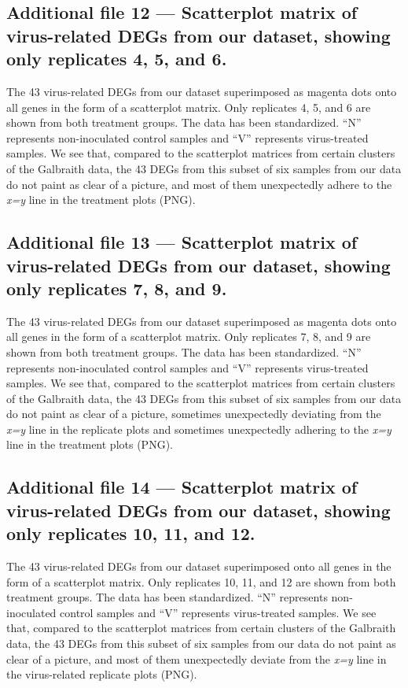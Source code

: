 \documentclass{bmcart}
\begin{document}
\begin{linenumbers}
\begin{backmatter}
  \subsection*{Additional file 12 --- Scatterplot matrix of virus-related DEGs from our dataset, showing only replicates 4, 5, and 6.}     
    The 43 virus-related DEGs from our dataset superimposed as magenta dots onto all genes in the form of a scatterplot matrix. Only replicates 4, 5, and 6 are shown from both treatment groups. The data has been standardized. ``N'' represents non-inoculated control samples and ``V'' represents virus-treated samples. We see that, compared to the scatterplot matrices from certain clusters of the Galbraith data, the 43 DEGs from this subset of six samples from our data do not paint as clear of a picture, and most of them unexpectedly adhere to the \textit{x=y} line in the treatment plots (PNG).
    
  \subsection*{Additional file 13 --- Scatterplot matrix of virus-related DEGs from our dataset, showing only replicates 7, 8, and 9.}    
    The 43 virus-related DEGs from our dataset superimposed as magenta dots onto all genes in the form of a scatterplot matrix. Only replicates 7, 8, and 9 are shown from both treatment groups. The data has been standardized. ``N'' represents non-inoculated control samples and ``V'' represents virus-treated samples. We see that, compared to the scatterplot matrices from certain clusters of the Galbraith data, the 43 DEGs from this subset of six samples from our data do not paint as clear of a picture, sometimes unexpectedly deviating from the \textit{x=y} line in the replicate plots and sometimes unexpectedly adhering to the \textit{x=y} line in the treatment plots (PNG).
    
  \subsection*{Additional file 14 --- Scatterplot matrix of virus-related DEGs from our dataset, showing only replicates 10, 11, and 12.}    
    The 43 virus-related DEGs from our dataset superimposed onto all genes in the form of a scatterplot matrix. Only replicates 10, 11, and 12 are shown from both treatment groups. The data has been standardized. ``N'' represents non-inoculated control samples and ``V'' represents virus-treated samples. We see that, compared to the scatterplot matrices from certain clusters of the Galbraith data, the 43 DEGs from this subset of six samples from our data do not paint as clear of a picture, and most of them unexpectedly deviate from the \textit{x=y} line in the virus-related replicate plots (PNG).
    

\end{backmatter}
\end{linenumbers}
\end{document}
